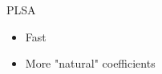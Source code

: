 \documentclass[t, 11pt]{beamer}
\begin{document}
\begin{frame}
	\frametitle{\insertsection}
	\frametitle{\insertsubsection}  
	PLSA
	
	\vspace{0.5cm}
	
	\begin{itemize}
		\item Fast
		\item More "natural" coefficients
	\end{itemize}	
	\vspace{0.5cm}
	
\end{frame}


%
%  

%	
%	
%	
%	
%	
%	
%	



%	
%	
\end{document}
